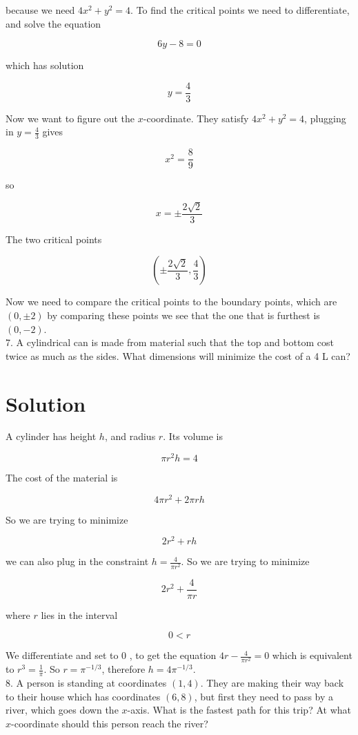 \documentclass[10pt]{article}
\begin{document}
because we need $4 x^{2}+y^{2}=4$. To find the critical points we need to differentiate, and solve the equation

$$
6 y-8=0
$$

which has solution

$$
y=\frac{4}{3}
$$

Now we want to figure out the $x$-coordinate. They satisfy $4 x^{2}+y^{2}=4$, plugging in $y=\frac{4}{3}$ gives

$$
x^{2}=\frac{8}{9}
$$

so

$$
x= \pm \frac{2 \sqrt{2}}{3}
$$

The two critical points

$$
\left( \pm \frac{2 \sqrt{2}}{3}, \frac{4}{3}\right)
$$

Now we need to compare the critical points to the boundary points, which are $(0, \pm 2)$ by comparing these points we see that the one that is furthest is $(0,-2)$.\\
7. A cylindrical can is made from material such that the top and bottom cost twice as much as the sides. What dimensions will minimize the cost of a 4 L can?

\section*{Solution}
A cylinder has height $h$, and radius $r$. Its volume is

$$
\pi r^{2} h=4
$$

The cost of the material is

$$
4 \pi r^{2}+2 \pi r h
$$

So we are trying to minimize

$$
2 r^{2}+r h
$$

we can also plug in the constraint $h=\frac{4}{\pi r^{2}}$. So we are trying to minimize

$$
2 r^{2}+\frac{4}{\pi r}
$$

where $r$ lies in the interval

$$
0<r
$$

We differentiate and set to 0 , to get the equation $4 r-\frac{4}{\pi r^{2}}=0$ which is equivalent to $r^{3}=\frac{1}{\pi}$. So $r=\pi^{-1 / 3}$, therefore $h=4 \pi^{-1 / 3}$.\\
8. A person is standing at coordinates $(1,4)$. They are making their way back to their house which has coordinates $(6,8)$, but first they need to pass by a river, which goes down the $x$-axis. What is the fastest path for this trip? At what $x$-coordinate should this person reach the river?
\end{document}
